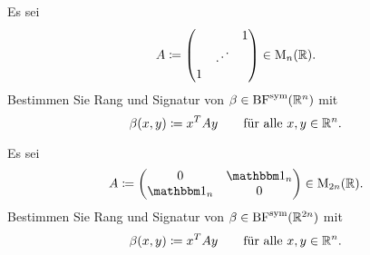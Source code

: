 \documentclass[a4paper, 10pt]{scrartcl}
\begin{document}





\begin{question}[subtitle = Rang und Signatur I]
  Es sei
  \[
              A
    \coloneqq \begin{pmatrix}
                  &         & 1 \\
                  & \iddots &   \\
                1 &         &
              \end{pmatrix}
    \in \operatorname{M}_{n}(\mathbb{R}).
  \]
  Bestimmen Sie Rang und Signatur von $\beta \in \operatorname{BF}^{\operatorname{sym}}(\mathbb{R}^n)$ mit
  \[
              \beta(x,y)
    \coloneqq x^T A y
    \qquad
    \text{für alle $x, y \in \mathbb{R}^n$}.
  \]
\end{question}





\begin{question}[subtitle = Rang und Signatur II]
  Es sei
  \[
              A
    \coloneqq \begin{pmatrix}
                0     & \Id_n \\
                \Id_n & 0
              \end{pmatrix}
    \in       \matrices{2n}{\Real}.
  \]
  Bestimmen Sie Rang und Signatur von $\beta \in \operatorname{BF}^{\operatorname{sym}}(\mathbb{R}^{2n})$ mit
  \[
              \beta(x,y)
    \coloneqq x^T A y
    \qquad
    \text{für alle $x, y \in \mathbb{R}^n$}.
  \]
\end{question}
\end{document}
